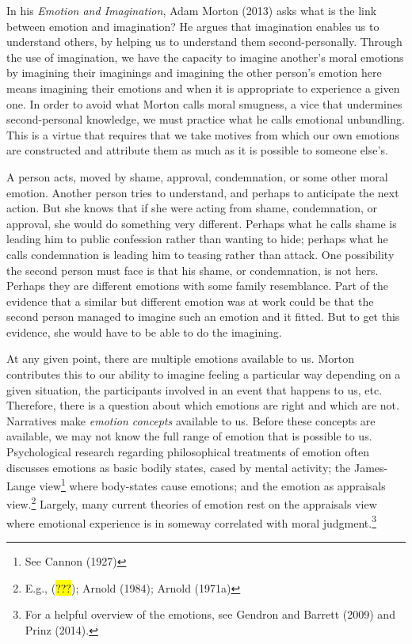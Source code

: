 \documentclass[
  letterpaper,
  DIV=11,
  numbers=noendperiod]{scrartcl}
\theoremstyle{remark}
\begin{document}
In his \emph{Emotion and Imagination}, Adam Morton (2013) asks what is
the link between emotion and imagination? He argues that imagination
enables us to understand others, by helping us to understand them
second-personally. Through the use of imagination, we have the capacity
to imagine another's moral emotions by imagining their imaginings and
imagining the other person's emotion here means imagining their emotions
and when it is appropriate to experience a given one. In order to avoid
what Morton calls moral smugness, a vice that undermines second-personal
knowledge, we must practice what he calls emotional unbundling. This is
a virtue that requires that we take motives from which our own emotions
are constructed and attribute them as much as it is possible to someone
else's.

A person acts, moved by shame, approval, condemnation, or some other
moral emotion. Another person tries to understand, and perhaps to
anticipate the next action. But she knows that if she were acting from
shame, condemnation, or approval, she would do something very different.
Perhaps what he calls shame is leading him to public confession rather
than wanting to hide; perhaps what he calls condemnation is leading him
to teasing rather than attack. One possibility the second person must
face is that his shame, or condemnation, is not hers. Perhaps they are
different emotions with some family resemblance. Part of the evidence
that a similar but different emotion was at work could be that the
second person managed to imagine such an emotion and it fitted. But to
get this evidence, she would have to be able to do the imagining.

At any given point, there are multiple emotions available to us. Morton
contributes this to our ability to imagine feeling a particular way
depending on a given situation, the participants involved in an event
that happens to us, etc. Therefore, there is a question about which
emotions are right and which are not. Narratives make \emph{emotion
concepts} available to us. Before these concepts are available, we may
not know the full range of emotion that is possible to us. Psychological
research regarding philosophical treatments of emotion often discusses
emotions as basic bodily states, cased by mental activity; the
James-Lange view\footnote{See Cannon (1927)} where body-states cause
emotions; and the emotion as appraisals view.\footnote{E.g., (\hl{???});
  Arnold (1984); Arnold (1971a)} Largely, many current theories of
emotion rest on the appraisals view where emotional experience is in
someway correlated with moral judgment.\footnote{For a helpful overview
  of the emotions, see Gendron and Barrett (2009) and Prinz (2014).}
\end{document}
